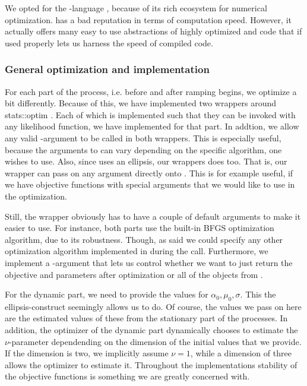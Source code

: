 We opted for the -language \cite{Rlang}, because of its rich ecosystem for numerical optimization.  has a bad reputation in terms of computation speed. However, it actually offers many easy to use abstractions of highly optimized  and  code that if used properly lets us harness the speed of compiled code. 
\subsubsection{General optimization and implementation}
For each part of the process, i.e. before and after ramping begins, we optimize a bit differently. Because of this, we have implemented two wrappers around {stats::optim} \cite{Rlang}. Each of which is implemented such that they can be invoked with any likelihood function, we have implemented for that part. In addtion, we allow any valid -argument to be called in both wrappers. This is especially useful, because the arguments to  can vary depending on the specific algorithm, one wishes to use. Also, since  uses an ellipsis, our wrappers does too. That is, our wrapper can pass on any argument directly onto . This is for example useful, if we have objective functions with special arguments that we would like to use in the optimization.

Still, the wrapper obviously has to have a couple of default arguments to make it easier to use. For instance, both parts use the built-in BFGS optimization algorithm, due to its robustness. Though, as said we could specify any other optimization algorithm implemented in  during the call. Furthermore, we implement a -argument that lets us control whether we want to just return the objective and parameters after optimization or all of the objects from .

For the dynamic part, we need to provide the values for $\alpha_0, \mu_0, \sigma$. This the ellipsis-construct seemingly allows us to do. Of course, the values we pass on here are the estimated values of these from the stationary part of the processes. In addition, the optimizer of the dynamic part dynamically chooses to estimate the $\nu$-parameter dependending on the dimension of the initial values that we provide. If the dimension is two, we implicitly assume $\nu = 1$, while a dimension of three allows the optimizer to estimate it. Throughout the implementations stability of the objective functions is something we are greatly concerned with. 

